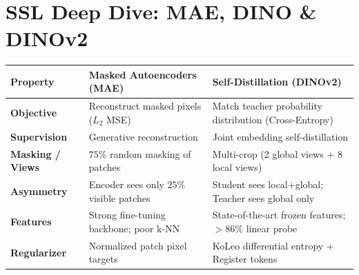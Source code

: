 \section{SSL Deep Dive: MAE, DINO \& DINOv2}\label{sec:ssl-deep}

\begin{mem}
\begin{tabularx}{\columnwidth}{@{}p{19mm} X X@{}}
\toprule
\textbf{Property} & \textbf{Masked Autoencoders (MAE)} & \textbf{Self-Distillation (DINOv2)} \\
\midrule
\textbf{Objective} & Reconstruct masked pixels ($L_2$ MSE) & Match teacher probability distribution (Cross-Entropy) \\
\textbf{Supervision} & Generative reconstruction & Joint embedding self-distillation \\
\textbf{Masking / Views} & $75\%$ random masking of patches & Multi-crop (2 global views + 8 local views) \\
\textbf{Asymmetry} & Encoder sees only $25\%$ visible patches & Student sees local+global; Teacher sees global only \\
\textbf{Features} & Strong fine-tuning backbone; poor k-NN & State-of-the-art frozen features; $>86\%$ linear probe \\
\textbf{Regularizer} & Normalized patch pixel targets & KoLeo differential entropy + Register tokens \\
\bottomrule
\end{tabularx}
\end{mem}

